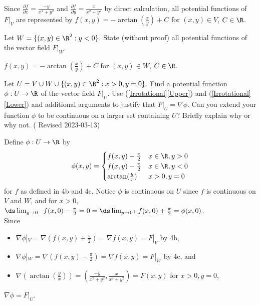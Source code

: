 \documentclass{exam}
\begin{document}
\begin{questions}
\begin{parts}
\begin{answer}{430pt}
Since $\tfrac{\partial f}{\partial x} = \tfrac{-y}{x^2+y^2}$ and $\tfrac{\partial f}{\partial y} = \tfrac{x}{x^2+y^2}$ by direct calculation, all potential functions of $F|_V$ are represented by $f(x,y) = -\arctan(\frac{x}{y}) + C$ for $(x,y) \in V$, $C \in \R$.
\end{answer}
\pagebreak
\item \label{Lower} Let $W = \{(x,y) \in \R^2 : y < 0\}$. State (without proof) all potential functions of the vector field $F|_W$. 
\begin{answer}{60pt}
$f(x,y) = -\arctan(\frac{x}{y}) + C$ for $(x,y) \in W$, $C \in \R$.
\end{answer}
\item Let $U = V \cup W \cup \{ (x,y) \in \R^2 : x > 0, y = 0\}$. Find a potential function $\phi : U \to \R$ of the vector field $F|_U$. Use (\ref{Irrotational}\ref{Upper}) and (\ref{Irrotational}\ref{Lower}) and additional arguments to justify that $F|_U = \nabla \phi$.  Can you extend your function $\phi$ to be continuous on a larger set containing $U$? Briefly explain why or why not. ({\color{Yellow} Revised 2023-03-13})
\begin{answer}{500pt}
Define $\phi: U \to \R$ by \begin{equation} \phi(x,y) = \begin{cases} 
      f(x,y)+\frac{\pi}{2} & x \in \R, y>0\\
      f(x,y)-\frac{\pi}{2} & x \in \R, y<0\\
      \arctan(\frac{y}{x}) & x>0, y=0 
\end{cases}\end{equation} for $f$ as defined in 4b and 4c. Notice $\phi$ is continuous on $U$ since $f$ is continuous on $V$ and $W$, and for $x>0$, $\ds \lim_{y \to 0^-} f(x,0)-\frac{\pi}{2} = 0 = \ds \lim_{y \to 0^+} f(x,0)+\frac{\pi}{2} = \phi(x,0)$.\\

Since\begin{itemize}
  \item $\nabla \phi|_V = \nabla (f(x,y)+\frac{\pi}{2}) = \nabla f(x,y) = F|_V$ by 4b,
  \item $\nabla \phi|_W = \nabla (f(x,y)-\frac{\pi}{2}) = \nabla f(x,y) = F|_W$ by 4c, and
  \item $\nabla (\arctan(\frac{y}{x})) = (\tfrac{-y}{x^2+y^2}, \tfrac{x}{x^2+y^2}) = F(x,y)$ for $x>0,y=0$,
\end{itemize}
$\nabla \phi = F|_U$.\\


\end{answer}
\end{parts}
\end{questions}
\end{document}

